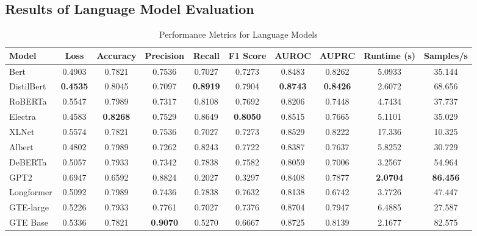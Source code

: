 \documentclass{article}
\theoremstyle{plain}
\theoremstyle{definition}
\theoremstyle{remark}
\begin{document}
\subsection{Results of Language Model Evaluation}
\label{resultsss}
\begin{table}[H]
\centering
\caption{Performance Metrics for Language Models}
\label{tab:metrics}
\begin{tabular}{l|ccccccccc}
\toprule
Model       & Loss    & Accuracy & Precision & Recall & F1 Score & AUROC  & AUPRC  & Runtime (s) & Samples/s \\ \midrule
Bert        & 0.4903  & 0.7821   & 0.7536    & 0.7027 & 0.7273   & 0.8483 & 0.8262 & 5.0933      & 35.144    \\
DistilBert  & \textbf{0.4535}  & 0.8045   & 0.7097    & \textbf{0.8919 }& 0.7904   & \textbf{0.8743} & \textbf{0.8426} & 2.6072      & 68.656    \\
RoBERTa     & 0.5547  & 0.7989   & 0.7317    & 0.8108 & 0.7692   & 0.8206 & 0.7448 & 4.7434      & 37.737    \\
Electra     & 0.4583  & \textbf{0.8268}   & 0.7529    & 0.8649 & \textbf{0.8050}   & 0.8515 & 0.7665 & 5.1101      & 35.029    \\
XLNet       & 0.5574  & 0.7821   & 0.7536    & 0.7027 & 0.7273   & 0.8529 & 0.8222 & 17.336      & 10.325    \\
Albert      & 0.4802  & 0.7989   & 0.7262    & 0.8243 & 0.7722   & 0.8387 & 0.7637 & 5.8252      & 30.729    \\
DeBERTa     & 0.5057  & 0.7933   & 0.7342    & 0.7838 & 0.7582   & 0.8059 & 0.7006 & 3.2567      & 54.964    \\
GPT2        & 0.6947  & 0.6592   & 0.8824    & 0.2027 & 0.3297   & 0.8408 & 0.7877 & \textbf{2.0704}      & \textbf{86.456}    \\
Longformer  & 0.5092  & 0.7989   & 0.7436    & 0.7838 & 0.7632   & 0.8138 & 0.6742 & 3.7726      & 47.447    \\
GTE-large   & 0.5226  & 0.7933   & 0.7761    & 0.7027 & 0.7376   & 0.8704 & 0.7947 & 6.4885      & 27.587    \\
GTE Base    & 0.5336  & 0.7821   & \textbf{0.9070}    & 0.5270 & 0.6667   & 0.8725 & 0.8139 & 2.1677      & 82.575    \\
\bottomrule
\end{tabular}
\end{table}

\vspace{1cm}
\end{document}
